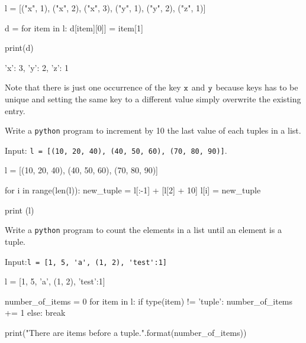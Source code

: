 \cprotEnv\begin{solution}
\begin{ipython}
l = [("x", 1), ("x", 2), ("x", 3), ("y", 1), ("y", 2), ("z", 1)]

d = {}
for item in l:
    d[item][0]] = item[1]
    
print(d)
\end{ipython}
\begin{ioutput}
{'x': 3, 'y': 2, 'z': 1}
\end{ioutput}
Note that there is just one occurrence of the key $\tt{x}$ and $\tt{y}$ because keys has to be unique and setting the same key to a different value simply overwrite the existing entry.
\end{solution}

\begin{question}
Write a \texttt{python} program to increment by 10 the last value of each tuples in a list.

\noindent
Input: \lstinline[language=iPython]|l = [(10, 20, 40), (40, 50, 60), (70, 80, 90)]|.
\end{question}

\cprotEnv\begin{solution}
\begin{ipython}
l = [(10, 20, 40), (40, 50, 60), (70, 80, 90)]

for i in range(len(l)):
    new_tuple = l[:-1] + [l[2] + 10]
    l[i] = new_tuple
    
print (l)
\end{ipython}
\begin{ioutput}
[(10, 20, 50), (40, 50, 70), (70, 80, 100)]
\end{ioutput}
\end{solution}

\begin{question}
Write a \texttt{python} program to count the elements in a list until an element is a tuple.

\noindent
Input:\lstinline[language=iPython]|l = [1, 5, 'a', (1, 2), 'test':1]|
\end{question}

\cprotEnv\begin{solution}
\begin{ipython}
l = [1, 5, 'a', (1, 2), 'test':1]

number_of_items = 0 
for item in l:
    if type(item) != 'tuple'{:}
        number_of_items += 1
    else:
        break
        
print("There are {} items before a tuple.".format(number_of_items))
\end{ipython}
\begin{ioutput}
\end{ioutput}
\end{solution}

